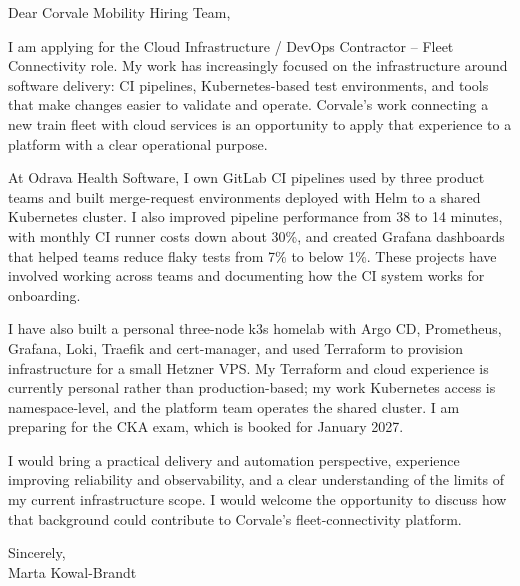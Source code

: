 \documentclass[11pt,a4paper]{article}
\begin{document}
Dear Corvale Mobility Hiring Team,

I am applying for the Cloud Infrastructure / DevOps Contractor -- Fleet Connectivity role. My work has increasingly focused on the infrastructure around software delivery: CI pipelines, Kubernetes-based test environments, and tools that make changes easier to validate and operate. Corvale’s work connecting a new train fleet with cloud services is an opportunity to apply that experience to a platform with a clear operational purpose.

At Odrava Health Software, I own GitLab CI pipelines used by three product teams and built merge-request environments deployed with Helm to a shared Kubernetes cluster. I also improved pipeline performance from 38 to 14 minutes, with monthly CI runner costs down about 30\%, and created Grafana dashboards that helped teams reduce flaky tests from 7\% to below 1\%. These projects have involved working across teams and documenting how the CI system works for onboarding.

I have also built a personal three-node k3s homelab with Argo CD, Prometheus, Grafana, Loki, Traefik and cert-manager, and used Terraform to provision infrastructure for a small Hetzner VPS. My Terraform and cloud experience is currently personal rather than production-based; my work Kubernetes access is namespace-level, and the platform team operates the shared cluster. I am preparing for the CKA exam, which is booked for January 2027.

I would bring a practical delivery and automation perspective, experience improving reliability and observability, and a clear understanding of the limits of my current infrastructure scope. I would welcome the opportunity to discuss how that background could contribute to Corvale’s fleet-connectivity platform.

Sincerely,\\
Marta Kowal-Brandt
\end{document}

